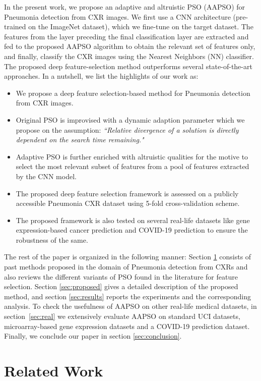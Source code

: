 \documentclass[final,3p,times]{elsarticle}
\begin{document}
In the present work, we propose an adaptive and altruistic PSO (AAPSO) for Pneumonia detection from CXR images. We first use a CNN architecture (pre-trained on the ImageNet dataset), which {we fine-tune} on the target dataset. The features from the layer preceding the final classification layer are extracted and fed to the proposed AAPSO algorithm to obtain the relevant set of features only, and finally, classify {the CXR images} using the  Nearest Neighbors (NN) classifier. The proposed deep {feature-selection} method outperforms several state-of-the-art approaches. In a nutshell, {we list} the highlights of our work as:
\begin{itemize}
   \item {We propose a deep feature selection-based method for Pneumonia detection from CXR images.}
   \item {Original PSO is improvised with a dynamic adaption parameter which we propose on the assumption: \textit{``Relative divergence of a solution is directly dependent on the search time remaining."}}
   \item {Adaptive PSO is further enriched with altruistic qualities for the motive to select the most relevant subset of features from a pool of features extracted by the CNN model.}
   \item {The proposed deep feature selection framework is assessed on a publicly accessible Pneumonia CXR dataset using 5-fold cross-validation scheme.}
   \item {The proposed framework is also tested on several real-life datasets like gene expression-based cancer prediction and COVID-19 prediction to ensure the robustness of the same.}
\end{itemize}
The rest of the paper is organized in the following manner: Section \ref{sec:related} consists of {past methods proposed} in the domain of Pneumonia detection from CXRs and also reviews the different variants of PSO found in the literature for feature selection. Section \ref{sec:proposed} gives a detailed description of the proposed method, and section \ref{sec:results} reports the experiments and the corresponding analysis. To check the usefulness of AAPSO on other real-life medical datasets, in section~\ref{sec:real} we extensively evaluate AAPSO on standard UCI datasets, {microarray-based} gene expression datasets and a COVID-19 prediction dataset. Finally, we conclude our paper in section \ref{sec:conclusion}.
\section{Related Work}
\label{sec:related}
\end{document}
